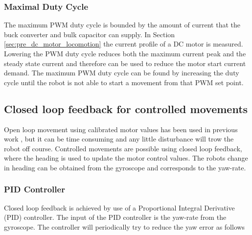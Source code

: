 \subsubsection{Maximal Duty Cycle}

The maximum PWM duty cycle is bounded by the amount of current that the buck converter and bulk capacitor can supply.
In Section \ref{sec:pre_dc_motor_locomotion} the current profile of a DC motor is measured.
Lowering the PWM duty cycle reduces both the maximum current peak and the steady state current and therefore can be used to reduce the motor start current demand.
The maximum PWM duty cycle can be found by increasing the duty cycle until the robot is not able to start a movement from that PWM set point.


\subsection{Closed loop feedback for controlled movements}

Open loop movement using calibrated motor values has been used in previous work \cite{legoc_uist_2016}, but it can be time consuming and any little disturbance will trow the robot off course.
Controlled movements are possible using closed loop feedback, where the heading is used to update the motor control values.
The robots change in heading can be obtained from the gyroscope and corresponds to the yaw-rate.

\subsubsection{PID Controller}


Closed loop feedback is achieved by use of a Proportional Integral Derivative (PID) controller.
The input of the PID controller is the yaw-rate from the gyroscope.
The controller will periodically try to reduce the yaw error as follows

